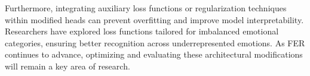 Furthermore, integrating auxiliary loss functions or regularization techniques within modified heads can prevent overfitting and improve model interpretability. Researchers have explored loss functions tailored for imbalanced emotional categories, ensuring better recognition across underrepresented emotions. As FER continues to advance, optimizing and evaluating these architectural modifications will remain a key area of research.


%
%
%
%
%
%
%
%
%
%
%
%
%
%
%
  
